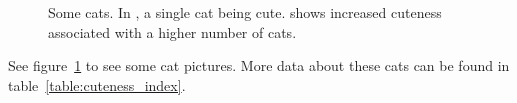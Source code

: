 \begin{figure}
  \caption{Some cats.
   In , a single cat being cute.
    shows increased cuteness associated with a higher number of cats.}
  \label{fig:cats}
\end{figure}
See figure~\ref{fig:cats} to see some cat pictures.
More data about these cats can be found in table~\ref{table:cuteness_index}.